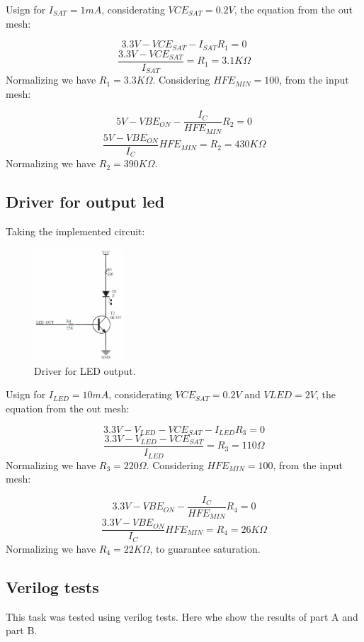Usign for $I_{SAT} = 1mA$, considerating $VCE_{SAT} = 0.2V$, 
the equation from the out mesh:

$$3.3V - VCE_{SAT} - I_{SAT}R_1 = 0$$
$$\frac{3.3V - VCE_{SAT}}{I_{SAT}} = R_1 = 3.1K\Omega$$
Normalizing we have $R_1 = 3.3K\Omega$.
Considering $HFE_{MIN} = 100$, from the input mesh:

$$5V - VBE_{ON} - \frac{I_C}{HFE_{MIN}}R_2 = 0$$
$$\frac{5V - VBE_{ON}}{I_C}HFE_{MIN} = R_2 = 430K\Omega$$
Normalizing we have $R_2 = 390K\Omega$.

\subsection*{Driver for output led}
Taking the implemented circuit:

\begin{figure}[H]
    \begin{centering}
    \includegraphics[width=0.3\textwidth]{data/Graficos3/LED_Driver.png}
    \par\end{centering}
    \caption{Driver for LED output.}
\end{figure}

Usign for $I_{LED} = 10mA$, considerating $VCE_{SAT} = 0.2V$ 
and $V{LED} = 2V$, the equation from the out mesh:

$$3.3V - V_{LED} - VCE_{SAT} - I_{LED}R_3 = 0$$
$$\frac{3.3V - V_{LED} - VCE_{SAT}}{I_{LED}} = R_3 = 110\Omega$$
Normalizing we have $R_3 = 220\Omega$.
Considering $HFE_{MIN} = 100$, from the input mesh:

$$3.3V - VBE_{ON} - \frac{I_C}{HFE_{MIN}}R_4 = 0$$
$$\frac{3.3V - VBE_{ON}}{I_C}HFE_{MIN} = R_4 = 26K\Omega$$
Normalizing we have $R_4 = 22K\Omega$, to guarantee saturation.


\subsection *{Verilog tests}
This task was tested using verilog tests. Here whe show the results of part A and part B.


